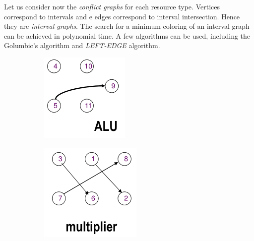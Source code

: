 Let us consider now the \textit{conflict graphs} for each resource type. Vertices correspond to  intervals  and  e edges correspond to interval intersection. Hence they are \textit{interval graphs}. The search for a minimum coloring of an interval graph can be achieved in polynomial time.  A  few algorithms can  be  used, including the Golumbic’s algorithm and \textit{LEFT-EDGE}  algorithm.
\begin{figure}[H]
    \centering
    \begin{subfigure}[b]{0.2\textwidth}
        \includegraphics[width=\textwidth]{./Cap5/Images/Image09.png}
        \caption{}
   		\label{fig:mul}
    \end{subfigure}
    \quad\quad\quad
    \begin{subfigure}[b]{0.2\textwidth}
        \includegraphics[width=\textwidth]{./Cap5/Images/Image08.png}

\end{subfigure}
\end{figure}
